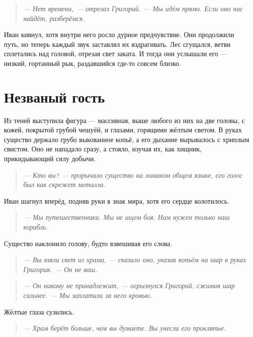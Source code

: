 \documentclass[12pt,a4paper]{book}
\newenvironment{dialogue}{\begin{quote}\itshape}{\end{quote}}
\begin{document}
\begin{dialogue}
--- Нет времени, --- отрезал Григорий. --- Мы идём прямо. Если оно нас найдёт, разберёмся.
\end{dialogue}

Иван кивнул, хотя внутри него росло дурное предчувствие. Они продолжили путь, но теперь каждый звук заставлял их вздрагивать. Лес сгущался, ветви сплетались над головой, отрезая свет заката. И тогда они услышали его --- низкий, гортанный рык, раздавшийся где-то совсем близко.

\section*{Незваный гость}

Из теней выступила фигура --- массивная, выше любого из них на две головы, с кожей, покрытой грубой чешуёй, и глазами, горящими жёлтым светом. В руках существо держало грубо выкованное копьё, а его дыхание вырывалось с хриплым свистом. Оно не нападало сразу, а стояло, изучая их, как хищник, прикидывающий силу добычи.

\begin{dialogue}
--- Кто вы? --- прорычало существо на ломаном общем языке, его голос был как скрежет металла.
\end{dialogue}

Иван шагнул вперёд, подняв руки в знак мира, хотя его сердце колотилось.

\begin{dialogue}
--- Мы путешественники. Мы не ищем боя. Нам нужен только наш корабль.
\end{dialogue}

Существо наклонило голову, будто взвешивая его слова.

\begin{dialogue}
--- Вы взяли свет из храма, --- сказало оно, указав копьём на шар в руках Григория. --- Он не ваш.
\end{dialogue}

\begin{dialogue}
--- Он никому не принадлежит, --- огрызнулся Григорий, сжимая шар сильнее. --- Мы заплатили за него кровью.
\end{dialogue}

Жёлтые глаза сузились.

\begin{dialogue}
--- Храм берёт больше, чем вы думаете. Вы унесли его проклятье.
\end{dialogue}
\end{document}
